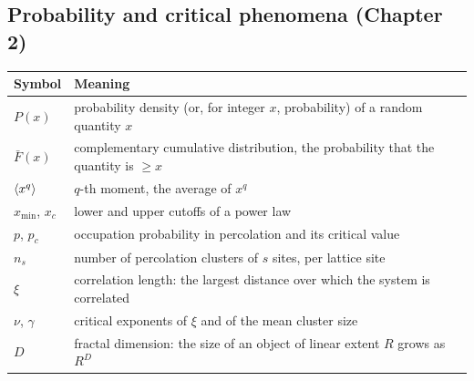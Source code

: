 \subsection*{Probability and critical phenomena (Chapter 2)}
\begin{longtable}{@{}p{22mm}p{120mm}@{}}
\toprule
Symbol & Meaning \\
\midrule
$P(x)$ & probability density (or, for integer $x$, probability) of a random quantity $x$ \\
$\bar F(x)$ & complementary cumulative distribution, the probability that the quantity is $\ge x$ \\
$\left\langle x^q \right\rangle$ & $q$-th moment, the average of $x^q$ \\
$x_{\min}$, $x_c$ & lower and upper cutoffs of a power law \\
$p$, $p_c$ & occupation probability in percolation and its critical value \\
$n_s$ & number of percolation clusters of $s$ sites, per lattice site \\
$\xi$ & correlation length: the largest distance over which the system is correlated \\
$\nu$, $\gamma$ & critical exponents of $\xi$ and of the mean cluster size \\
$D$ & fractal dimension: the size of an object of linear extent $R$ grows as $R^{D}$ \\
\bottomrule
\end{longtable}

